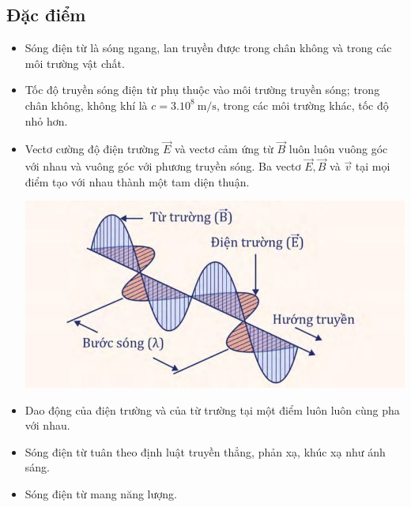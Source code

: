\subsection {Đặc điểm}
\begin{itemize}
	\item Sóng điện từ là sóng ngang, lan truyền được trong chân không và trong các môi trường vật chất.
	\item Tốc độ truyền sóng điện từ phụ thuộc vào môi trường truyền sóng; trong chân không, không khí là $c=3.10^8\ \text{m/s}$, trong các môi trường khác, tốc độ nhỏ hơn.
	\item Vectơ cường độ điện trường $\vec{E}$ và vectơ cảm ứng từ $\vec {B}$ luôn luôn vuông góc với nhau và vuông góc với phương truyền sóng. Ba vectơ $\vec{E}, \vec{B}$ và $\vec{v}$ tại mọi điểm tạo với nhau thành một tam diện thuận.
	\begin{center}
		\includegraphics[scale=0.7]{../figs/4-3-1.JPG}
	\end{center}
	\item Dao động của điện trường và của từ trường tại một điểm luôn luôn cùng pha với nhau.
	\item Sóng điện từ tuân theo định luật truyền thẳng, phản xạ, khúc xạ như ánh sáng.
	\item Sóng điện từ mang năng lượng.

\end{itemize}
